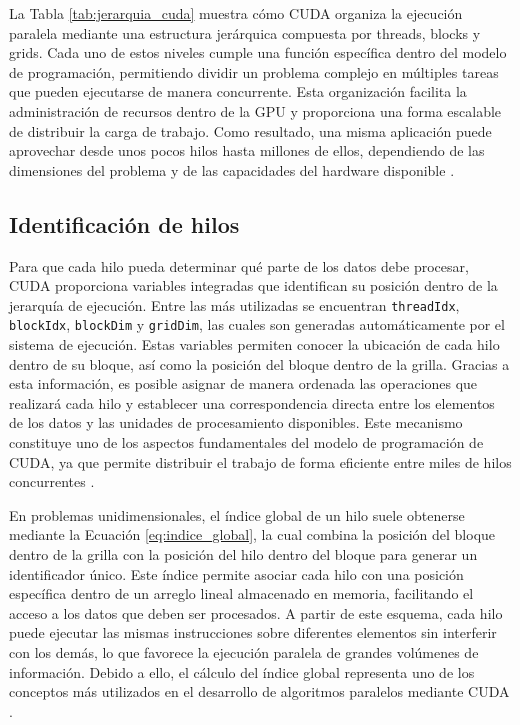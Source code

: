La Tabla \ref{tab:jerarquia_cuda} muestra cómo CUDA organiza la ejecución paralela mediante una estructura jerárquica compuesta por threads, blocks y grids. Cada uno de estos niveles cumple una función específica dentro del modelo de programación, permitiendo dividir un problema complejo en múltiples tareas que pueden ejecutarse de manera concurrente. Esta organización facilita la administración de recursos dentro de la GPU y proporciona una forma escalable de distribuir la carga de trabajo. Como resultado, una misma aplicación puede aprovechar desde unos pocos hilos hasta millones de ellos, dependiendo de las dimensiones del problema y de las capacidades del hardware disponible \cite{threadHierarchy,nvidiaProgrammingGuide}.

\subsection{Identificación de hilos}

Para que cada hilo pueda determinar qué parte de los datos debe procesar, CUDA proporciona variables integradas que identifican su posición dentro de la jerarquía de ejecución. Entre las más utilizadas se encuentran \texttt{threadIdx}, \texttt{blockIdx}, \texttt{blockDim} y \texttt{gridDim}, las cuales son generadas automáticamente por el sistema de ejecución. Estas variables permiten conocer la ubicación de cada hilo dentro de su bloque, así como la posición del bloque dentro de la grilla. Gracias a esta información, es posible asignar de manera ordenada las operaciones que realizará cada hilo y establecer una correspondencia directa entre los elementos de los datos y las unidades de procesamiento disponibles. Este mecanismo constituye uno de los aspectos fundamentales del modelo de programación de CUDA, ya que permite distribuir el trabajo de forma eficiente entre miles de hilos concurrentes \cite{threadIndexing,investigacionCUDA}.

En problemas unidimensionales, el índice global de un hilo suele obtenerse mediante la Ecuación \ref{eq:indice_global}, la cual combina la posición del bloque dentro de la grilla con la posición del hilo dentro del bloque para generar un identificador único. Este índice permite asociar cada hilo con una posición específica dentro de un arreglo lineal almacenado en memoria, facilitando el acceso a los datos que deben ser procesados. A partir de este esquema, cada hilo puede ejecutar las mismas instrucciones sobre diferentes elementos sin interferir con los demás, lo que favorece la ejecución paralela de grandes volúmenes de información. Debido a ello, el cálculo del índice global representa uno de los conceptos más utilizados en el desarrollo de algoritmos paralelos mediante CUDA \cite{threadIndexing,threadCheatsheet}.

